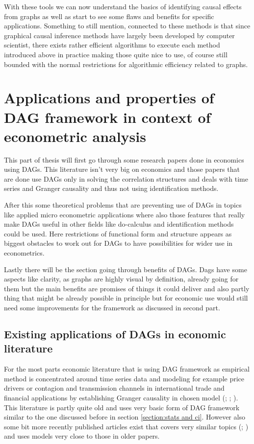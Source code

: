 \documentclass[main=english,12pt,a4paper,pdftex,econ,utf8]{aaltothesis}
\begin{document}
With these tools we can now understand the basics of identifying causal effects from graphs as well as start to see some flaws and benefits for specific applications. Something to still mention, connected to these methods is that since graphical causal inference methods have largely been developed by computer scientist, there exists rather efficient algorithms to execute each method introduced above in practice making those quite nice to use, of course still bounded with the normal restrictions for algorithmic efficiency related to graphs.

\clearpage

\section{Applications and properties of DAG framework in context of econometric analysis} \label{section:economics}

This part of thesis will first go through some research papers done in economics using DAGs. This literature isn't very big on economics and those papers that are done use DAGs only in solving the correlation structures and deals with time series and Granger causality and thus not using identification methods.

After this some theoretical problems that are preventing use of DAGs in topics like applied micro econometric applications where also those features that really make DAGs useful in other fields like do-calculus and identification methods could be used. Here restrictions of functional form and structure appears as biggest obstacles to work out for DAGs to have possibilities for wider use in econometrics.

Lastly there will be the section going through benefits of DAGs. Dags have some aspects like clarity, as graphs are highly visual by definition, already going for them but the main benefits are promises of things it could deliver and also partly thing that might be already possible in principle but for economic use would still need some improvements for the framework as discussed in second part.

\subsection{Existing applications of DAGs in economic literature}

For the most parts economic literature that is using DAG framework as empirical method is concentrated around time series data and modeling for example price drivers or contagion and transmission channels in international trade and financial applications by establishing Granger causality in chosen model (\cite{Awokuse2003}; \cite{Bessler2003}; \cite{Yang2006}). This literature is partly quite old and uses very basic form of DAG framework similar to the one discussed before in section \ref{section:stats and ci}. However also some bit more recently published articles exist that covers very similar topics (\cite{Jayech2016}; \cite{Ji2018}) and uses models very close to those in older papers.
\end{document}
